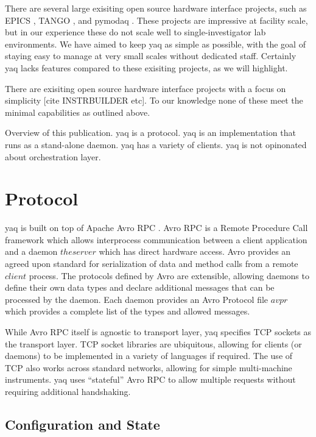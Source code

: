 \documentclass{article}
\begin{document}
There are several large exisiting open source hardware interface projects, such as EPICS \cite{DalesioLR1991a}, TANGO \cite{tango-controls.org}, and pymodaq \cite{WeberSebastien2021a}.
These projects are impressive at facility scale, but in our experience these do not scale well to single-investigator lab environments.
We have aimed to keep yaq as simple as possible, with the goal of staying easy to manage at very small scales without dedicated staff.
Certainly yaq lacks features compared to these exisiting projects, as we will highlight.

There are exisiting open source hardware interface projects with a focus on simplicity [cite INSTRBUILDER etc].
To our knowledge none of these meet the minimal capabilities as outlined above.

Overview of this publication.
yaq is a protocol.
yaq is an implementation that runs as a stand-alone daemon.
yaq has a variety of clients.
yaq is not opinonated about orchestration layer.

\section{Protocol}

yaq is built on top of Apache Avro RPC \cite{AvroSpecification}.
Avro RPC is a Remote Procedure Call framework which allows interprocess communication between a client application and a daemon \(the server\) which has direct hardware access.
Avro provides an agreed upon standard for serialization of data and method calls from a remote \(client\) process.
The protocols defined by Avro are extensible, allowing daemons to define their own data types and declare additional messages that can be processed by the daemon.
Each daemon provides an Avro Protocol file \(avpr\) which provides a complete list of the types and allowed messages.

While Avro RPC itself is agnostic to transport layer, yaq specifies TCP sockets as the transport layer.
TCP socket libraries are ubiquitous, allowing for clients (or daemons) to be implemented in a variety of languages if required.
The use of TCP also works across standard networks, allowing for simple multi-machine instruments.
yaq uses ``stateful'' Avro RPC to allow multiple requests without requiring additional handshaking.

\subsection{Configuration and State}
\end{document}
